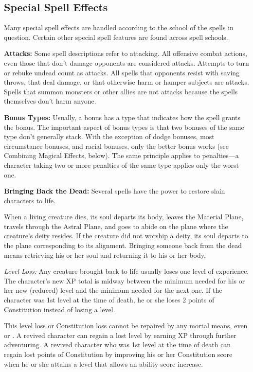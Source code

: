 \subsection{Special Spell Effects}
Many special spell effects are handled according to the school of the spells in question. Certain other special spell features are found across spell schools.

\textbf{Attacks:} Some spell descriptions refer to attacking. All offensive combat actions, even those that don't damage opponents are considered attacks. Attempts to turn or rebuke undead count as attacks. All spells that opponents resist with saving throws, that deal damage, or that otherwise harm or hamper subjects are attacks. Spells that summon monsters or other allies are not attacks because the spells themselves don't harm anyone.

\textbf{Bonus Types:} Usually, a bonus has a type that indicates how the spell grants the bonus. The important aspect of bonus types is that two bonuses of the same type don't generally stack. With the exception of dodge bonuses, most circumstance bonuses, and racial bonuses, only the better bonus works (see Combining Magical Effects, below). The same principle applies to penalties---a character taking two or more penalties of the same type applies only the worst one.

\textbf{Bringing Back the Dead:} Several spells have the power to restore slain characters to life.

When a living creature dies, its soul departs its body, leaves the Material Plane, travels through the Astral Plane, and goes to abide on the plane where the creature's deity resides. If the creature did not worship a deity, its soul departs to the plane corresponding to its alignment. Bringing someone back from the dead means retrieving his or her soul and returning it to his or her body.

\textit{Level Loss:} Any creature brought back to life usually loses one level of experience. The character's new XP total is midway between the minimum needed for his or her new (reduced) level and the minimum needed for the next one. If the character was 1st level at the time of death, he or she loses 2 points of Constitution instead of losing a level.

This level loss or Constitution loss cannot be repaired by any mortal means, even  or . A revived character can regain a lost level by earning XP through further adventuring. A revived character who was 1st level at the time of death can regain lost points of Constitution by improving his or her Constitution score when he or she attains a level that allows an ability score increase.


